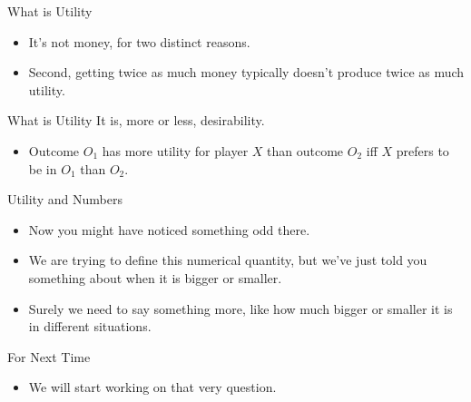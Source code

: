 \documentclass[
  ignorenonframetext,
]{beamer}
\providecommand{\tightlist}{%
  \setlength{\itemsep}{0pt}\setlength{\parskip}{0pt}}
\begin{document}
\begin{frame}{What is Utility}
\protect\hypertarget{what-is-utility-3}{}
\begin{itemize}
\tightlist
\item
  It's not money, for two distinct reasons.
\item
  Second, getting twice as much money typically doesn't produce twice as
  much utility.
\end{itemize}
\end{frame}

\begin{frame}{What is Utility}
\protect\hypertarget{what-is-utility-4}{}
It is, more or less, desirability.

\begin{itemize}
\tightlist
\item
  Outcome \(O_1\) has more utility for player \(X\) than outcome \(O_2\)
  iff \(X\) prefers to be in \(O_1\) than \(O_2\).
\end{itemize}
\end{frame}

\begin{frame}{Utility and Numbers}
\protect\hypertarget{utility-and-numbers}{}
\begin{itemize}
\tightlist
\item
  Now you might have noticed something odd there.
\item
  We are trying to define this numerical quantity, but we've just told
  you something about when it is bigger or smaller.
\item
  Surely we need to say something more, like how much bigger or smaller
  it is in different situations.
\end{itemize}
\end{frame}

\begin{frame}{For Next Time}
\protect\hypertarget{for-next-time}{}
\begin{itemize}
\tightlist
\item
  We will start working on that very question.
\end{itemize}
\end{frame}
\end{document}
